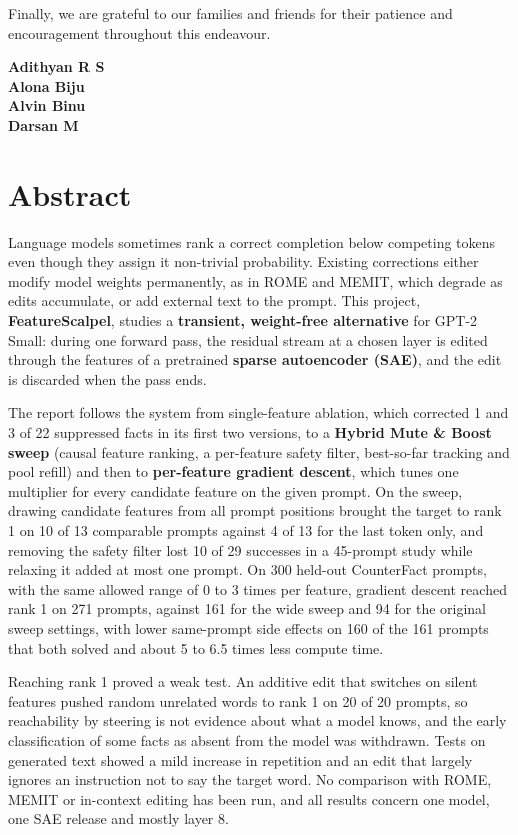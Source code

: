 \documentclass[12pt,a4paper]{report}
\begin{document}
Finally, we are grateful to our families and friends for their patience and encouragement throughout this endeavour.

\vspace{1cm}
\begin{flushright}\textbf{Adithyan R S}\\ \textbf{Alona Biju}\\ \textbf{Alvin Binu}\\ \textbf{Darsan M}\end{flushright}

\chapter*{\centering Abstract}
Language models sometimes rank a correct completion below competing tokens even though they assign it non-trivial probability. Existing corrections either modify model weights permanently, as in ROME and MEMIT, which degrade as edits accumulate, or add external text to the prompt. This project, \textbf{FeatureScalpel}, studies a \textbf{transient, weight-free alternative} for GPT-2 Small: during one forward pass, the residual stream at a chosen layer is edited through the features of a pretrained \textbf{sparse autoencoder (SAE)}, and the edit is discarded when the pass ends.

The report follows the system from single-feature ablation, which corrected 1 and 3 of 22 suppressed facts in its first two versions, to a \textbf{Hybrid Mute \& Boost sweep} (causal feature ranking, a per-feature safety filter, best-so-far tracking and pool refill) and then to \textbf{per-feature gradient descent}, which tunes one multiplier for every candidate feature on the given prompt. On the sweep, drawing candidate features from all prompt positions brought the target to rank 1 on 10 of 13 comparable prompts against 4 of 13 for the last token only, and removing the safety filter lost 10 of 29 successes in a 45-prompt study while relaxing it added at most one prompt. On 300 held-out CounterFact prompts, with the same allowed range of 0 to 3 times per feature, gradient descent reached rank 1 on 271 prompts, against 161 for the wide sweep and 94 for the original sweep settings, with lower same-prompt side effects on 160 of the 161 prompts that both solved and about 5 to 6.5 times less compute time.

Reaching rank 1 proved a weak test. An additive edit that switches on silent features pushed random unrelated words to rank 1 on 20 of 20 prompts, so reachability by steering is not evidence about what a model knows, and the early classification of some facts as absent from the model was withdrawn. Tests on generated text showed a mild increase in repetition and an edit that largely ignores an instruction not to say the target word. No comparison with ROME, MEMIT or in-context editing has been run, and all results concern one model, one SAE release and mostly layer 8.
\end{document}
